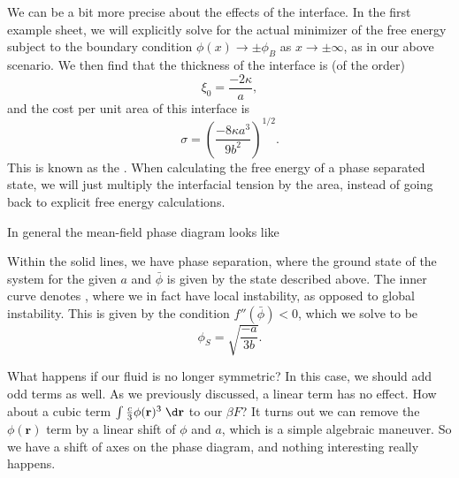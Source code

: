 \documentclass[a4paper]{article}
\begin{document}
We can be a bit more precise about the effects of the interface. In the first example sheet, we will explicitly solve for the actual minimizer of the free energy subject to the boundary condition $\phi(x) \to \pm \phi_B$ as $x \to \pm \infty$, as in our above scenario. We then find that the thickness of the interface is (of the order)
\[
  \xi_0 = \frac{-2 \kappa}{a},
\]
and the cost per unit area of this interface is
\[
  \sigma = \left(\frac{-8 \kappa a^3}{9 b^2}\right)^{1/2}.
\]
This is known as the . When calculating the free energy of a phase separated state, we will just multiply the interfacial tension by the area, instead of going back to explicit free energy calculations.

In general the mean-field phase diagram looks like
\begin{center}
\end{center}
Within the solid lines, we have phase separation, where the ground state of the system for the given $a$ and $\bar{\phi}$ is given by the state described above. The inner curve denotes , where we in fact have local instability, as opposed to global instability. This is given by the condition $f''(\bar{\phi}) < 0$, which we solve to be
\[
  \phi_S = \sqrt{\frac{-a}{3b}}.
\]

What happens if our fluid is no longer symmetric? In this case, we should add odd terms as well. As we previously discussed, a linear term has no effect. How about a cubic term $\int \frac{c}{3} \phi(\mathbf{r})^3 \;\d \mathbf{r}$ to our $\beta F$? It turns out we can remove the $\phi(\mathbf{r})$ term by a linear shift of $\phi$ and $a$, which is a simple algebraic maneuver. So we have a shift of axes on the phase diagram, and nothing interesting really happens.
\end{document}
